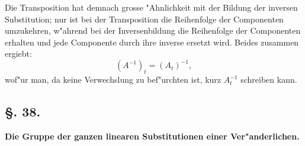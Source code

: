 \documentclass[12pt,a4paper]{article}
\theoremstyle{weber}
\begin{document}
Die Transposition hat demnach grosse "Ahnlichkeit mit der Bildung der inversen Substitution; nur ist bei der Transposition die Reihenfolge der Componenten umzukehren, w"ahrend bei der Inversenbildung die Reihenfolge der Componenten erhalten und jede Componente durch ihre inverse ersetzt wird. Beides zusammen ergiebt:
\begin{equation}\label{eq:25}
(A^{-1})_t = (A_t)^{-1},
\end{equation}
wof"ur man, da keine Verwechslung zu bef"urchten ist, kurz $A_t^{-1}$ schreiben kann.

\bigskip

\subsection*{\S. 38.}

\begin{center}
\textbf{Die Gruppe der ganzen linearen Substitutionen einer Ver"anderlichen.}
\end{center}

\bigskip
\end{document}
